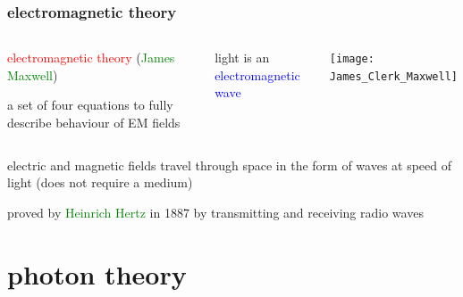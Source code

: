 \documentclass[12pt,xcolor=svgnames,handout]{beamer}
\newcommand{\tightframetitle}[1]{ %
\frametitle{#1}\vspace{-.6\baselineskip}}
\begin{document}
\begin{frame}
\tightframetitle{electromagnetic theory}

\begin{columns}
\begin{block}{}
\textcolor{red}{electromagnetic theory} (\textcolor{Green}{James Maxwell})

a set of four equations to fully describe behaviour of EM fields
\end{block}

\begin{block}{}
light is an \textcolor{blue}{electromagnetic wave}
\end{block}

\begin{block}{}
\centering
\texttt{[image: James\_Clerk\_Maxwell]}
\end{block}
\end{columns}

\pause

\begin{block}{}
electric and magnetic fields travel through space in the form of waves at speed of light (does not require a medium)
\end{block}

\pause

\begin{block}{}
proved by \textcolor{Green}{Heinrich Hertz} in 1887 by transmitting and receiving radio waves
\end{block}

\end{frame}

\section{photon theory}
\end{document}
